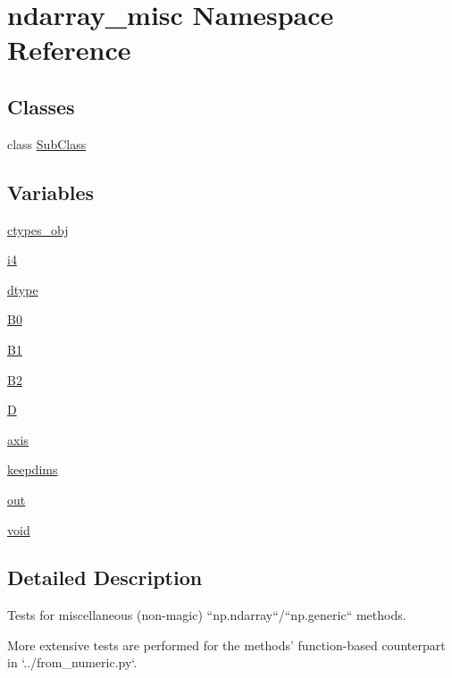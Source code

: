 \hypertarget{namespacendarray__misc}{}\section{ndarray\+\_\+misc Namespace Reference}
\label{namespacendarray__misc}
\subsection*{Classes}
\begin{DoxyCompactItemize}
\item 
class \hyperlink{classndarray__misc_1_1SubClass}{Sub\+Class}
\end{DoxyCompactItemize}
\subsection*{Variables}
\begin{DoxyCompactItemize}
\item 
\hyperlink{namespacendarray__misc_afa338185b0abcb48ac08122ed1d9dbee}{ctypes\+\_\+obj}
\item 
\hyperlink{namespacendarray__misc_afededed8632cc24b9a5800c426534131}{i4}
\item 
\hyperlink{namespacendarray__misc_a7a1226804dd43bb147ce069b4afab3af}{dtype}
\item 
\hyperlink{namespacendarray__misc_a9832073607de48915fc994e0e58ad11d}{B0}
\item 
\hyperlink{namespacendarray__misc_ab1ba591f31a267c0cb5beef7ae3cf91d}{B1}
\item 
\hyperlink{namespacendarray__misc_aa6153635eef61fcb0f3ee2a3ca447d85}{B2}
\item 
\hyperlink{namespacendarray__misc_a5813500442623e2aea38221f96b35ee2}{D}
\item 
\hyperlink{namespacendarray__misc_a137fd19477f4774ebc7a8fb68d6c6cc4}{axis}
\item 
\hyperlink{namespacendarray__misc_a8c989f8aad26df9a097ee59fbf17ab3e}{keepdims}
\item 
\hyperlink{namespacendarray__misc_aa26ac13aee03e2e8818f8ee4fe94d66a}{out}
\item 
\hyperlink{namespacendarray__misc_aba354d1683c46f1c46e2bf98a7452595}{void}
\end{DoxyCompactItemize}


\subsection{Detailed Description}
\begin{DoxyVerb}Tests for miscellaneous (non-magic) ``np.ndarray``/``np.generic`` methods.

More extensive tests are performed for the methods'
function-based counterpart in `../from_numeric.py`.\end{DoxyVerb}
 

